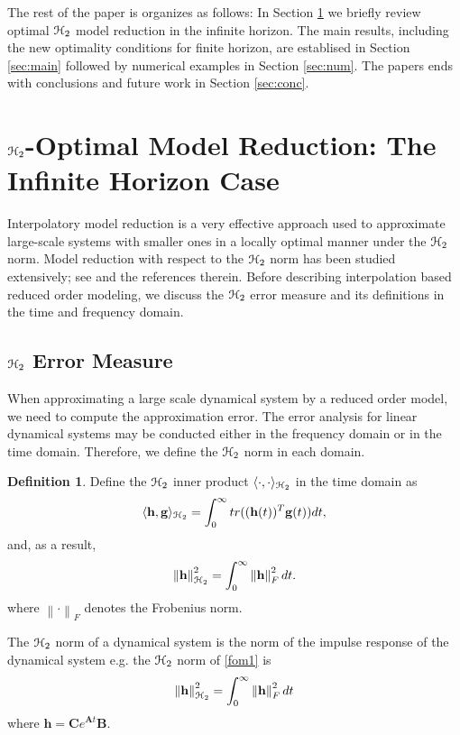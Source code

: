 \documentclass[preprint]{elsarticle}
\theoremstyle{definition}
\theoremstyle{definition}
\def\mathcal{\EuScript}
\numberwithin{equation}{section}
\newtheorem{Definition}[Theorem]{Definition}
\newcommand{\A}{\mathbf{A}}
\newcommand{\B}{\mathbf{B}}
\newcommand{\C}{\mathbf{C}}
\newcommand{\h}{\mathbf{h}}
\newcommand{\g}{\mathbf{g}}
\newcommand{\ch}{\mathcal{H}}
\newcommand{\norm}[1]{\left\lVert#1\right\rVert}
\begin{document}
The rest of the paper is organizes as follows: In Section  \ref{sec:intro} we briefly review optimal  $\ch_2$ model reduction in the infinite horizon. The main results, including the new optimality conditions for finite horizon, are establised in Section \ref{sec:main} followed by numerical examples in Section \ref{sec:num}. The papers ends with conclusions and future work in Section \ref{sec:conc}.

\section{$\ch_2$-Optimal Model Reduction: The Infinite Horizon Case} \label{sec:intro}
Interpolatory model reduction is a very effective approach used to approximate large-scale systems with smaller ones in a locally optimal manner under the $\ch_2$ norm. Model reduction with respect to the $\ch_2$ norm has been studied extensively; see \cite{BarCO91, BryC90, FulO90, MeiL67, Hal92, HylB85, SpaMM92, YanL99, LepMPV91, AniBGA13} and the references therein.   Before describing interpolation based reduced order modeling, we discuss the $\ch_2$ error measure and its definitions in the time and frequency domain.
\subsection{$\ch_2$ Error Measure}
When approximating a large scale dynamical system by a reduced order model, we need to compute the approximation error. The error analysis for linear dynamical systems may be conducted either in the frequency domain or in the time domain. Therefore, we define the $\ch_2$ norm in each domain. 

\begin{Definition}
Define the $\ch_2$ inner product $\langle \cdot, \cdot \rangle_{\ch_2}$ in the time domain as 
\begin{align*}
\langle \h, \g \rangle_{\ch_2} =\int_0^\infty tr((\h(t))^T \g(t)) dt, 
\end{align*}
and, as a result, 
\begin{align*}
\norm{\h}_{\ch_2}^2=\int_0^\infty \norm{\h}_F^2 dt.
\end{align*} 
where $\norm{\cdot}_F$ denotes the Frobenius norm.
\end{Definition}
The $\ch_2$ norm of a dynamical system is the norm of the impulse response of the dynamical system e.g. the $\ch_2$ norm of \eqref{fom1} is
\begin{align*}
\norm{\h}_{\ch_2}^2=\int_0^\infty  \norm{\h}_F^2 dt
\end{align*} 
where $\h=\C e^{\A t}\B$.
\end{document}
